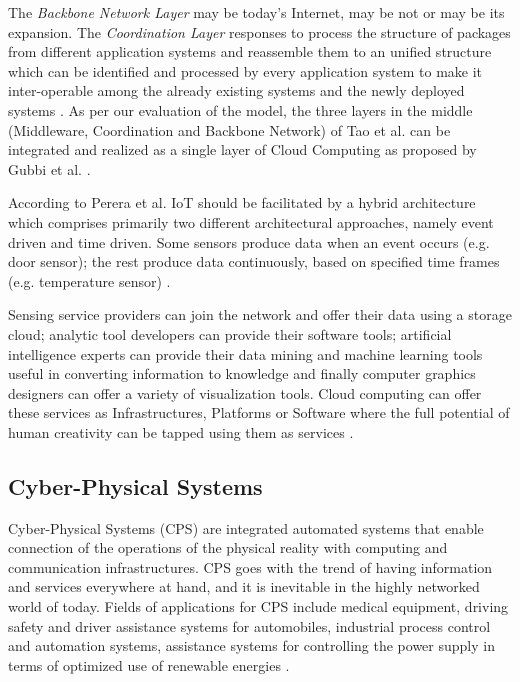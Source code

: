 {The \textit{Backbone Network Layer} may be today's Internet, may be not or may be its expansion. The \textit{Coordination Layer} responses to process the structure of packages from different application systems and reassemble them to an unified structure which can be identified and processed by every application system to make it inter-operable among the already existing systems and the newly deployed systems \cite{IOTFUTURE}. As per our evaluation of the model, the three layers in the middle (Middleware, Coordination and Backbone Network) of Tao et al. \cite{IOTFUTURE} can be integrated and realized as a single layer of Cloud Computing as proposed by Gubbi et al. \cite{IOTGUBBI}.

According to Perera et al. \cite{CONAWAREIOT} \acs{IoT} should be facilitated by a hybrid architecture which comprises primarily two different architectural approaches, namely event driven and time driven. Some sensors produce data when an event occurs (e.g. door sensor); the rest produce data continuously, based on specified time frames (e.g. temperature sensor)  \cite{CONAWAREIOT}.

Sensing service providers can join the network and offer their data using a storage cloud; analytic tool developers can provide their software tools; artificial intelligence experts can provide their data mining and machine learning tools useful in converting information to knowledge and finally computer graphics designers can offer a variety of visualization tools. Cloud computing can offer these services as Infrastructures, Platforms or Software where the full potential of human creativity can be tapped using them as services \cite{IOTGUBBI}. 

\subsection{Cyber-Physical Systems} \label{CPS}
Cyber-Physical Systems (\acs{CPS}) are integrated automated systems that enable connection of the operations of the physical reality with computing and communication infrastructures. \acs{CPS} goes with the trend of having information and services everywhere at hand, and it is inevitable in the highly networked world of today. Fields of applications for \acs{CPS} include medical equipment, driving safety and driver assistance systems for automobiles, industrial process control and automation systems, assistance systems for controlling the power supply in terms of optimized use of renewable energies \cite{CYBERIN,IN4DESIGN}. 

}
